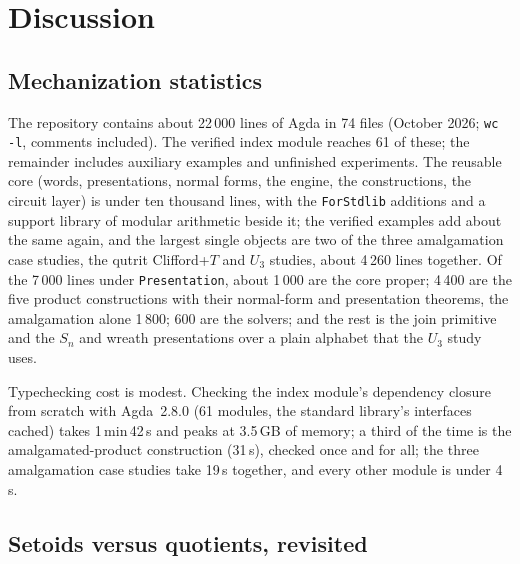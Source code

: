 \section{Discussion}\label{sec:discussion}

\subsection{Mechanization statistics}\label{sec:stats}

The repository contains about 22\,000 lines of Agda in 74 files
(October 2026; \texttt{wc -l}, comments included).  The verified index
module reaches 61 of these; the remainder includes auxiliary examples
and unfinished experiments.
The reusable core (words, presentations, normal forms, the engine, the
constructions, the circuit layer) is under ten thousand lines, with the
\texttt{ForStdlib} additions and a support library of modular arithmetic
beside it; the verified examples add
about the same again, and the largest single objects are two of the three
amalgamation case studies, the qutrit Clifford+$T$ and $U_3$ studies,
about 4\,260 lines together.  Of
the 7\,000 lines under \texttt{Presentation}, about 1\,000 are the core
proper; 4\,400 are the five product constructions with their normal-form
and presentation theorems, the amalgamation alone 1\,800; 600 are the
solvers; and the rest is the join primitive and the $S_n$ and wreath
presentations over a plain alphabet that the $U_3$ study uses.

Typechecking cost is modest.  Checking the index module's dependency closure from
scratch with Agda~2.8.0 (61 modules, the standard library's interfaces
cached) takes 1\,min\,42\,s and peaks at 3.5\,GB of memory; a third of
the time is the amalgamated-product construction (31\,s), checked once
and for all; the three amalgamation case studies take 19\,s together,
and every other module is under 4\,s.

\subsection{Setoids versus quotients, revisited}\label{sec:setoids}

